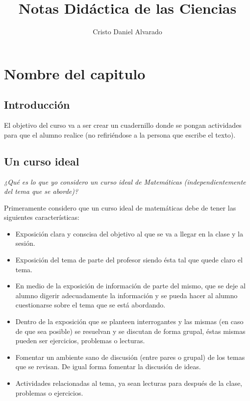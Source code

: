 \documentclass[12pt]{report}
\newcounter{it}
\theoremstyle{largebreak}
\begin{document}
    \setlength{\parskip}{5pt} %
    \setlength{\parindent}{12pt} %
    \title{Notas Didáctica de las Ciencias}
    \author{Cristo Daniel Alvarado}
    \maketitle

    \tableofcontents %

    
    \chapter{Nombre del capitulo}
    
    \section*{Introducción}

    El objetivo del curso va a ser crear un cuadernillo donde se pongan actividades para que el alumno realice (no refiriéndose a la persona que escribe el texto).


    \section{Un curso ideal}

    \textit{¿Qué es lo que yo considero un curso ideal de Matemáticas (independientemente del tema que se aborde)?}
    
    Primeramente considero que un curso ideal de matemáticas debe de tener las siguientes características:

    \begin{itemize}
        \item Exposición clara y conscisa del objetivo al que se va a llegar en la clase y la sesión.
        \item Exposición del tema de parte del profesor siendo ésta tal que quede claro el tema.
        \item En medio de la exposición de información de parte del mismo, que se deje al alumno digerir adecuadamente la información y se pueda hacer al alumno cuestionarse sobre el tema que se está abordando.
        \item Dentro de la exposición que se planteen interrogantes y las mismas (en caso de que sea posible) se resuelvan y se discutan de forma grupal, éstas mismas pueden ser ejercicios, problemas o lecturas.
        \item Fomentar un ambiente sano de discusión (entre pares o grupal) de los temas que se revisan. De igual forma fomentar la discusión de ideas.
        \item Actividades relacionadas al tema, ya sean lecturas para después de la clase, problemas o ejercicios.
    \end{itemize}
\end{document}
